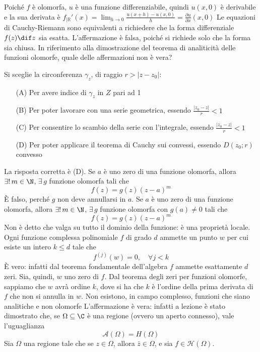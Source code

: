     Poiché $f$ è olomorfa, $u$ è una funzione differenziabile, quindi $u(x,0)$ è derivabile e la sua derivata è 
    $f_{| \mathbb{R}}'(x) = \lim_{h \to 0} \frac{u(x+h) - u(x,0)}{h} = \frac{\partial u}{\partial x}(x,0)$
Le equazioni di Cauchy-Riemann sono equivalenti a richiedere che la forma differenziale $f(z) \dif z$ sia esatta.
    L'affermazione è falsa, poiché si richiede solo che la forma sia chiusa.
    In riferimento alla dimostrazione del teorema di analiticità delle funzioni olomorfe, quale delle affermazioni non è vera?

    Si sceglie la circonferenza $\gamma_z$, di raggio $r > |z - z_0|$: \begin{enumerate}
        \item[(A)] Per avere indice di $\gamma_z$ in $Z$ pari ad 1
        \item[(B)] Per poter lavorare con una serie geometrica, essendo $ \frac{|z_0 - z|}{r} < 1$
        \item[(C)] Per consentire lo scambio della serie con l'integrale, essendo $ \frac{|z_0 - z|}{r} < 1$
        \item[(D)] Per poter applicare il teorema di Cauchy sui convessi, essendo $D(z_0 ; r)$ convesso
    \end{enumerate}
    La risposta corretta è (D).
    Se $a$ è uno zero di una funzione olomorfa, allora $\exists!\, m \in \N$, $ \exists\, g$ funzione olomorfa tali che \[
        f(z) = g(z)(z-a)^m
    \]
    È falso, perché $ g $ non deve annullarsi in $ a $.
    Se $a$ è uno zero di una funzione olomorfa, allora $\exists!\, m \in \N$, $ \exists\, g$ funzione olomorfa con $ g(a)\neq 0 $ tali che \[
        f(z) = g(z)(z-a)^m
    \]
    Non è detto che valga su tutto il dominio della funzione: è una proprietà locale. 
    Ogni funzione complessa polinomiale $f$ di grado $d$ ammette un punto $w$ per cui esiste un intero $k \le  d$ tale che \[
        f^{(j)}(w) = 0, \quad \forall j < k
    \]
    È vero: infatti dal teorema fondamentale dell'algebra $f$ ammette esattamente $d$ zeri. Sia, quindi, $w$ uno zero di $f$. Dal teorema degli zeri per funzioni olomorfe, sappiamo che $w$ avrà ordine $k$, dove si ha che $k$ è l'ordine della prima derivata di $f$ che non si annulla in $w$.
    Non esistono, in campo complesso, funzioni che siano analitiche e non olomorfe
    L'affermazione è vera: infatti a lezione è stato dimostrato che, se $ \Omega \subseteq \C $ è una regione (ovvero un aperto connesso), vale l'uguaglianza \[
        \mathcal{A}(\Omega) = H(\Omega)
    \]
    Sia $\Omega$ una regione tale che se $z \in \Omega$, allora $\bar{z} \in \Omega$, e sia $f \in \mathcal{H}(\Omega)$.
    
